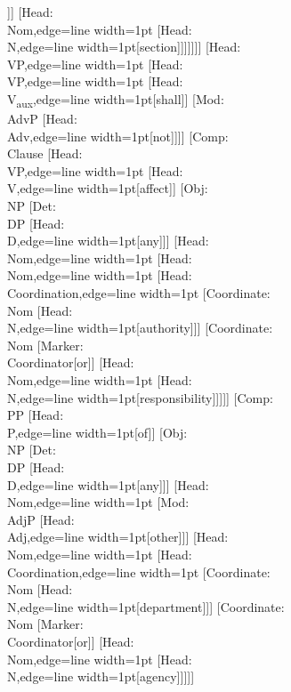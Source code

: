 \documentclass[tikz,border=12pt]{standalone}
\newcommand{\Node}[2]{\small\textsf{#1:}\\{#2}}
\begin{document}
\begin{forest}
                        [\Node{Head}{D},edge={line width=1pt}[this]]]
                    [\Node{Head}{Nom},edge={line width=1pt}
                        [\Node{Head}{N},edge={line width=1pt}[section]]]]]]]
    [\Node{Head}{VP},edge={line width=1pt}
        [\Node{Head}{VP},edge={line width=1pt}
            [\Node{Head}{V\textsubscript{aux}},edge={line width=1pt}[shall]]
            [\Node{Mod}{AdvP}
                [\Node{Head}{Adv},edge={line width=1pt}[not]]]]
        [\Node{Comp}{Clause}
            [\Node{Head}{VP},edge={line width=1pt}
                [\Node{Head}{V},edge={line width=1pt}[affect]]
                [\Node{Obj}{NP}
                    [\Node{Det}{DP}
                        [\Node{Head}{D},edge={line width=1pt}[any]]]
                    [\Node{Head}{Nom},edge={line width=1pt}
                        [\Node{Head}{Nom},edge={line width=1pt}
                            [\Node{Head}{Coordination},edge={line width=1pt}
                                [\Node{Coordinate}{Nom}
                                    [\Node{Head}{N},edge={line width=1pt}[authority]]]
                                [\Node{Coordinate}{Nom}
                                    [\Node{Marker}{Coordinator}[or]]
                                    [\Node{Head}{Nom},edge={line width=1pt}
                                        [\Node{Head}{N},edge={line width=1pt}[responsibility]]]]]
                            [\Node{Comp}{PP}
                                [\Node{Head}{P},edge={line width=1pt}[of]]
                                [\Node{Obj}{NP}
                                    [\Node{Det}{DP}
                                        [\Node{Head}{D},edge={line width=1pt}[any]]]
                                    [\Node{Head}{Nom},edge={line width=1pt}
                                        [\Node{Mod}{AdjP}
                                            [\Node{Head}{Adj},edge={line width=1pt}[other]]]
                                        [\Node{Head}{Nom},edge={line width=1pt}
                                            [\Node{Head}{Coordination},edge={line width=1pt}
                                                [\Node{Coordinate}{Nom}
                                                    [\Node{Head}{N},edge={line width=1pt}[department]]]
                                                [\Node{Coordinate}{Nom}
                                                    [\Node{Marker}{Coordinator}[or]]
                                                    [\Node{Head}{Nom},edge={line width=1pt}
                                                        [\Node{Head}{N},edge={line width=1pt}[agency]]]]]

\end{forest}
\end{document}
